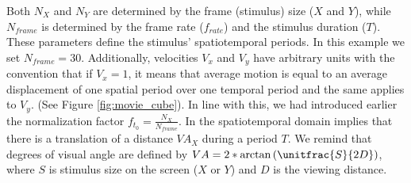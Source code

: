 \documentclass[a4paper,11pt]{article}%
\begin{document}
Both $N_X$ and $N_Y$ are determined by the frame (stimulus) size ($X$ and $Y$), while $N_{frame}$ is determined by the frame rate ($f_{rate}$) and the stimulus duration ($T$). These parameters define the stimulus' spatiotemporal periods. In this example we set $N_{frame}=30$. Additionally, velocities $V_x$ and $V_y$ have arbitrary units with the convention that if $V_x=1$, it means that average motion is equal to an average displacement of one spatial period over one temporal period and the same applies to $V_y$. (See Figure \ref{fig:movie_cube}).  
In line with this, we had introduced earlier the normalization factor $f_{t_0} =\frac{N_X}{N_{frame}}$. In the spatiotemporal domain implies that there is a translation of a distance $VA_X$ during a period $T$. We remind that degrees of visual angle are defined by $VA=2*\arctan\left(\unitfrac{S}{2D}\right)$, where $S$ is stimulus size on the screen ($X$ or $Y$) and $D$ is the viewing distance. 
\end{document}
